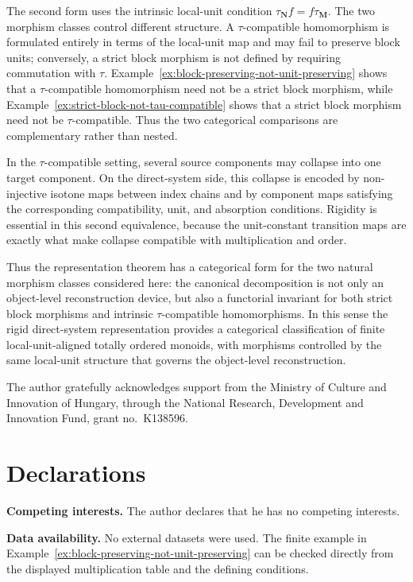 \documentclass[pdflatex,sn-mathphys-num]{sn-jnl}
\theoremstyle{thmstyleone}%
\theoremstyle{thmstyletwo}%
\theoremstyle{thmstylethree}%
\begin{document}
The second form uses the intrinsic local-unit condition \(\tau_{\mathbf N}f=f\tau_{\mathbf M}\).
The two morphism classes control different structure.
A \(\tau\)-compatible homomorphism is formulated entirely in terms of the local-unit map and may fail to preserve block units; conversely, a strict block morphism is not defined by requiring commutation with \(\tau\).
Example~\ref{ex:block-preserving-not-unit-preserving} shows that a \(\tau\)-compatible homomorphism need not be a strict block morphism, while Example~\ref{ex:strict-block-not-tau-compatible} shows that a strict block morphism need not be \(\tau\)-compatible.
Thus the two categorical comparisons are complementary rather than nested.

In the \(\tau\)-compatible setting, several source components may collapse into one target component.
On the direct-system side, this collapse is encoded by non-injective isotone maps between index chains and by component maps satisfying the corresponding compatibility, unit, and absorption conditions.
Rigidity is essential in this second equivalence, because the unit-constant transition maps are exactly what make collapse compatible with multiplication and order.

Thus the representation theorem has a categorical form for the two natural morphism classes considered here: the canonical decomposition is not only an object-level reconstruction device, but also a functorial invariant for both strict block morphisms and intrinsic \(\tau\)-compatible homomorphisms.
In this sense the rigid direct-system representation provides a categorical classification of finite local-unit-aligned totally ordered monoids, with morphisms controlled by the same local-unit structure that governs the object-level reconstruction.

\backmatter


The author gratefully acknowledges support from the Ministry of Culture and Innovation of Hungary, through the National Research, Development and Innovation Fund, grant no.~K138596.
\bigskip

\section*{Declarations}

\noindent\textbf{Competing interests.}
The author declares that he has no competing interests.

\noindent\textbf{Data availability.}
No external datasets were used.
The finite example in Example~\ref{ex:block-preserving-not-unit-preserving} can be checked directly from the displayed multiplication table and the defining conditions.
\end{document}
